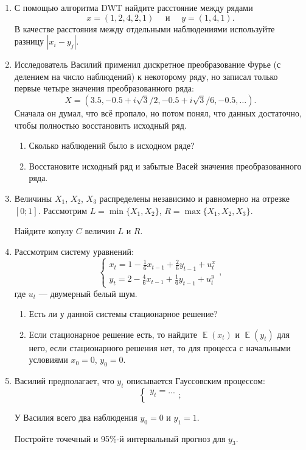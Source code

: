 \documentclass[12pt]{article} %
\DeclareMathOperator{\E}{\mathbb{E}}
\begin{document}
\begin{enumerate}

    \item С помощью алгоритма DWT найдите расстояние между рядами
    \[
    x = (1, 2, 4, 2, 1) \quad \text{ и } \quad y = (1, 4, 1).    
    \]
    В качестве расстояния между отдельными наблюдениями используйте разницу $|x_i - y_j|$.
    
    \item Исследователь Василий применил дискретное преобразование Фурье (с делением на число наблюдений) к некоторому ряду,
    но записал только первые четыре значения преобразованного ряда:
    \[
    X = (3.5, -0.5 + i\sqrt{3}/2 , -0.5 + i\sqrt{3}/6, -0.5, \ldots).    
    \]
    Сначала он думал, что всё пропало, но потом понял, что данных достаточно, 
    чтобы полностью восстановить исходный ряд.
    
    \begin{enumerate}
        \item Сколько наблюдений было в исходном ряде?
        \item Восстановите исходный ряд и забытые Васей значения преобразованного ряда.
    \end{enumerate}
    
    \item Величины $X_1$, $X_2$, $X_3$ распределены независимо и равномерно на
    отрезке $[0; 1]$. Рассмотрим $L = \min\{X_1, X_2\}$, $R = \max\{X_1, X_2, X_3\}$.
    
    Найдите копулу $C$ величин $L$ и $R$. 

    \item Рассмотрим систему уравнений:
    \[
    \begin{cases}
    x_t = 1 - \frac{1}{6}x_{t-1} + \frac{2}{6}y_{t-1} + u^x_t \\
    y_t = 2 - \frac{4}{6}x_{t-1} + \frac{1}{6}y_{t-1} + u^y_t
    \end{cases},
    \]
    где $u_t$ — двумерный белый шум.
    \begin{enumerate}
    \item Есть ли у данной системы стационарное решение?
    \item Если стационарное решение есть, то найдите $\E(x_t)$ и $\E(y_t)$ для него,
    если стационарного решения нет, то для процесса с начальными условиями $x_0 = 0$, $y_0 = 0$.
    \end{enumerate}
    
    \item Василий предполагает, что $y_t$ описывается Гауссовским процессом:
    \[
    \begin{cases} 
        y_t = ... \\
    \end{cases};
    \]

    У Василия всего два наблюдения $y_0 = 0$ и $y_1 = 1$. 

    Постройте точечный и 95\%-й интервальный прогноз для $y_3$.

\end{enumerate}
\end{document}
